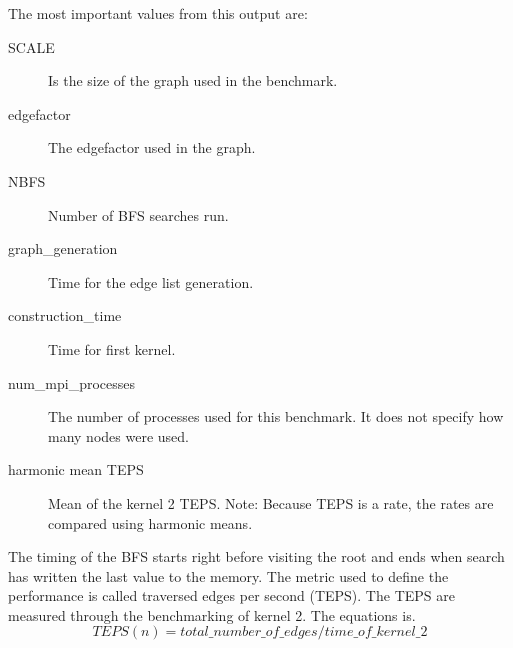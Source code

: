 The most important values from this output are:
\begin{description}
\item[SCALE] Is the size of the graph used in the benchmark.
\item[edgefactor] The edgefactor used in the graph.
\item[NBFS] Number of BFS searches run.
\item[graph\_generation] Time for the edge list generation.
\item[construction\_time] Time for first kernel.
\item[num\_mpi\_processes] The number of processes used for this benchmark. It does not specify how many nodes were used.
\item[harmonic mean TEPS] Mean  of the kernel 2 TEPS. Note: Because TEPS is a rate, the rates are compared using harmonic means\cite{harmonic_mean}.
\end{description}

The timing of the BFS starts right before visiting the root and ends when search has written the last value to the memory. The metric used to define the performance is called traversed edges per second (TEPS). The TEPS are measured through the benchmarking of kernel 2. The equations is.
\begin{equation}
TEPS(n) = total\_number\_ of\_edges / time\_of\_kernel\_2
\end{equation}









